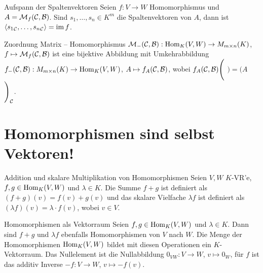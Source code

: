 \begin{Satz}{Aufspann der Spaltenvektoren}
    Seien $f: V \rightarrow W$ Homomorphismus und $A = \mathcal{M}_{f}(\mathcal{C},\mathcal{B})$.
    Sind $s_1, \ldots, s_n \in K^m$ die Spaltenvektoren von $A$, dann ist
    $\langle {s_1}_{\mathcal{C}}, \ldots, {s_n}_{\mathcal{C}} \rangle = \operatorname{im} f$.
\end{Satz}

\begin{Satz}{Zuordnung Matrix -- Homomorphismus}
    $\mathcal{M}_{-}(\mathcal{C},\mathcal{B}): \operatorname{Hom}_K(V, W) \rightarrow M_{m \times n}(K)$, \\
    $f \mapsto \mathcal{M}_{f}(\mathcal{C},\mathcal{B})$ ist eine bijektive Abbildung mit
    Umkehrabbildung \\
    $f_-(\mathcal{C}, \mathcal{B}): M_{m \times n}(K) \rightarrow \operatorname{Hom}_K(V, W)$,
    $A \mapsto f_A(\mathcal{C}, \mathcal{B})$, wobei
    $f_A(\mathcal{C}, \mathcal{B})\Bigg($%
    $\Bigg) = \Bigg(A$%
    $\Bigg)_{\mathcal{C}}$.
\end{Satz}

\section{%
    Homomorphismen sind selbst Vektoren!%
}

\enlargethispage{10mm}

\begin{Def}{Addition und skalare Multiplikation von Homomorphismen}
    Seien $V, W$ $K$-VR'e, $f, g \in \operatorname{Hom}_K(V, W)$ und $\lambda \in K$.
    Die Summe $f + g$ ist definiert als
    $(f + g)(v) = f(v) + g(v)$ und das skalare Vielfache $\lambda f$ ist
    definiert als $(\lambda f)(v) = \lambda \cdot f(v)$,
    wobei $v \in V$.
\end{Def}

\begin{Satz}{Homomorphismen als Vektorraum}
    Seien $f, g \in \operatorname{Hom}_K(V, W)$ und $\lambda \in K$.
    Dann sind $f + g$ und $\lambda f$ ebenfalls Homomorphismen
    von $V$ nach $W$.
    Die Menge der Homomorphismen $\operatorname{Hom}_K(V, W)$ bildet mit diesen
    Operationen ein $K$-Vektorraum.
    Das Nullelement ist die Null\-abbildung
    $0_{VW}: V \rightarrow W$, $v \mapsto 0_W$, für $f$ ist das additiv Inverse
    $-f: V \rightarrow W$, $v \mapsto -f(v)$.
\end{Satz}

